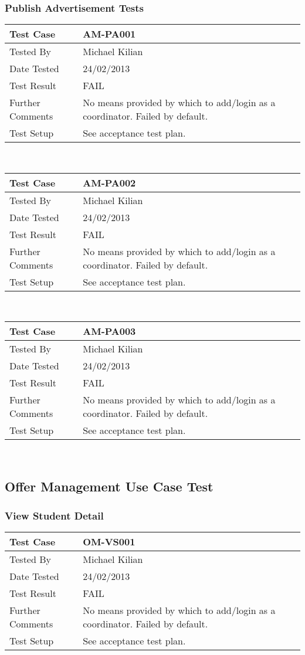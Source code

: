 \documentclass{l3deliverable}
\begin{document}
\subsubsection{Publish Advertisement Tests}
\begin{tabular}{lp{10cm}}
\hline 
\textbf{Test Case} & AM-PA001\tabularnewline
\hline 
\hline 
Tested By & Michael Kilian\tabularnewline
\hline 
Date Tested & 24/02/2013\tabularnewline
\hline 
Test Result & FAIL\tabularnewline
\hline
Further Comments & No means provided by which to add/login as a coordinator. Failed by default. \tabularnewline
\hline
Test Setup &  See acceptance test plan.\tabularnewline
\hline
\end{tabular}\\

\begin{tabular}{lp{10cm}}
\hline 
\textbf{Test Case} & AM-PA002\tabularnewline
\hline 
\hline 
Tested By & Michael Kilian\tabularnewline
\hline 
Date Tested & 24/02/2013\tabularnewline
\hline 
Test Result & FAIL\tabularnewline
\hline
Further Comments & No means provided by which to add/login as a coordinator. Failed by default. \tabularnewline
\hline
Test Setup &  See acceptance test plan.\tabularnewline
\hline
\end{tabular}\\

\begin{tabular}{lp{10cm}}
\hline 
\textbf{Test Case} & AM-PA003\tabularnewline
\hline 
\hline 
Tested By & Michael Kilian\tabularnewline
\hline 
Date Tested & 24/02/2013\tabularnewline
\hline 
Test Result & FAIL\tabularnewline
\hline
Further Comments & No means provided by which to add/login as a coordinator. Failed by default. \tabularnewline
\hline
Test Setup &  See acceptance test plan.\tabularnewline
\hline
\end{tabular}\\

\newpage
\subsection{Offer Management Use Case Test}
 
\subsubsection{View Student Detail}
\begin{tabular}{lp{10cm}}
\hline 
\textbf{Test Case} & OM-VS001\tabularnewline
\hline 
\hline 
Tested By & Michael Kilian\tabularnewline
\hline 
Date Tested & 24/02/2013\tabularnewline
\hline 
Test Result & FAIL\tabularnewline
\hline
Further Comments & No means provided by which to add/login as a coordinator. Failed by default. \tabularnewline
\hline
Test Setup &  See acceptance test plan.\tabularnewline
\hline
\end{tabular}\\
\end{document}
